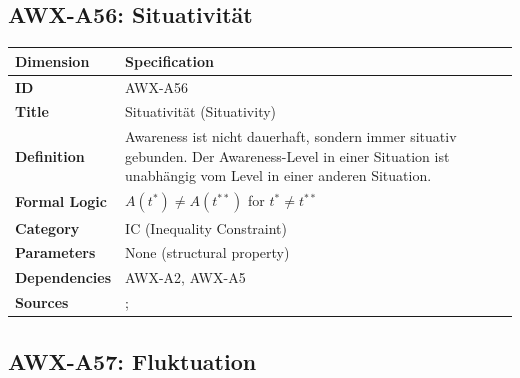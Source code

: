 
\subsection{AWX-A56: Situativität}

\begin{table}[htbp]
\small
\begin{tabular}{p{3cm}p{11cm}}
\toprule
\textbf{Dimension} & \textbf{Specification} \\
\midrule
\textbf{ID} & AWX-A56 \\
\textbf{Title} & Situativität (Situativity) \\
\textbf{Definition} & Awareness ist nicht dauerhaft, sondern immer situativ gebunden. Der Awareness-Level in einer Situation ist unabhängig vom Level in einer anderen Situation. \\
\textbf{Formal Logic} & $A(t^*) \neq A(t^{**})$ for $t^* \neq t^{**}$ \\
\textbf{Category} & IC (Inequality Constraint) \\
\textbf{Parameters} & None (structural property) \\
\textbf{Dependencies} & AWX-A2, AWX-A5 \\
\textbf{Sources} & \citet{kahneman2003maps}; \citet{tversky1981framing} \\
\bottomrule
\end{tabular}
\end{table}


\subsection{AWX-A57: Fluktuation}

